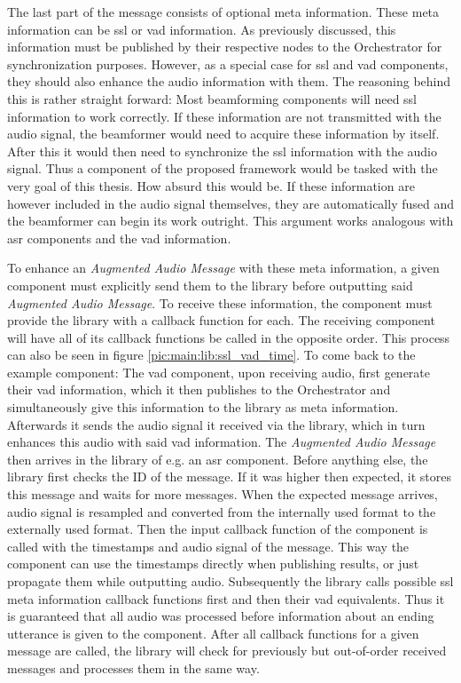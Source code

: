 The last part of the message consists of optional meta information.
These meta information can be \gls{ssl} or \gls{vad} information.
As previously discussed, this information must be published by their respective nodes to the Orchestrator for synchronization purposes.
However, as a special case for \gls{ssl} and \gls{vad} components, they should also enhance the audio information with them.
The reasoning behind this is rather straight forward:
Most beamforming components will need \gls{ssl} information to work correctly.
If these information are not transmitted with the audio signal, the beamformer would need to acquire these information by itself.
After this it would then need to synchronize the \gls{ssl} information with the audio signal.
Thus a component of the proposed framework would be tasked with the very goal of this thesis.
How absurd this would be.
If these information are however included in the audio signal themselves, they are automatically fused and the beamformer can begin its work outright.
This argument works analogous with \gls{asr} components and the \gls{vad} information.

To enhance an \textit{Augmented Audio Message} with these meta information, a given component must explicitly send them to the library before outputting said \textit{Augmented Audio Message}.
To receive these information, the component must provide the library with a callback function for each.
The receiving component will have all of its callback functions be called in the opposite order.
This process can also be seen in figure \ref{pic:main:lib:ssl_vad_time}.
To come back to the example component:
The \gls{vad} component, upon receiving audio, first generate their \gls{vad} information, which it then publishes to the Orchestrator and simultaneously give this information to the library as meta information.
Afterwards it sends the audio signal it received via the library, which in turn enhances this audio with said \gls{vad} information.
The \textit{Augmented Audio Message} then arrives in the library of e.g. an \gls{asr} component.
Before anything else, the library first checks the ID of the message.
If it was higher then expected, it stores this message and waits for more messages.
When the expected message arrives, audio signal is resampled and converted from the internally used format to the externally used format.
Then the input callback function of the component is called with the timestamps and audio signal of the message.
This way the component can use the timestamps directly when publishing results, or just propagate them while outputting audio.
Subsequently the library calls possible \gls{ssl} meta information callback functions first and then their \gls{vad} equivalents.
Thus it is guaranteed that all audio was processed before information about an ending utterance is given to the component. 
After all callback functions for a given message are called, the library will check for previously but out-of-order received messages and processes them in the same way.




